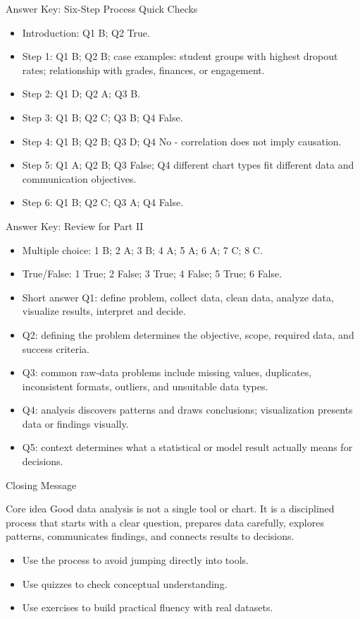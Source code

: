 \documentclass[aspectratio=169,11pt]{beamer}
\begin{document}
\begin{frame}{Answer Key: Six-Step Process Quick Checks}
\begin{itemize}\small
  \item Introduction: Q1 B; Q2 True.
  \item Step 1: Q1 B; Q2 B; case examples: student groups with highest dropout rates; relationship with grades, finances, or engagement.
  \item Step 2: Q1 D; Q2 A; Q3 B.
  \item Step 3: Q1 B; Q2 C; Q3 B; Q4 False.
  \item Step 4: Q1 B; Q2 B; Q3 D; Q4 No - correlation does not imply causation.
  \item Step 5: Q1 A; Q2 B; Q3 False; Q4 different chart types fit different data and communication objectives.
  \item Step 6: Q1 B; Q2 C; Q3 A; Q4 False.
\end{itemize}
\end{frame}

\begin{frame}{Answer Key: Review for Part II}
\begin{itemize}\small
  \item Multiple choice: 1 B; 2 A; 3 B; 4 A; 5 A; 6 A; 7 C; 8 C.
  \item True/False: 1 True; 2 False; 3 True; 4 False; 5 True; 6 False.
  \item Short answer Q1: define problem, collect data, clean data, analyze data, visualize results, interpret and decide.
  \item Q2: defining the problem determines the objective, scope, required data, and success criteria.
  \item Q3: common raw-data problems include missing values, duplicates, inconsistent formats, outliers, and unsuitable data types.
  \item Q4: analysis discovers patterns and draws conclusions; visualization presents data or findings visually.
  \item Q5: context determines what a statistical or model result actually means for decisions.
\end{itemize}
\end{frame}

\begin{frame}{Closing Message}
\begin{block}{Core idea}
Good data analysis is not a single tool or chart. It is a disciplined process that starts with a clear question, prepares data carefully, explores patterns, communicates findings, and connects results to decisions.
\end{block}
\begin{itemize}
  \item Use the process to avoid jumping directly into tools.
  \item Use quizzes to check conceptual understanding.
  \item Use exercises to build practical fluency with real datasets.
\end{itemize}
\end{frame}
\end{document}

